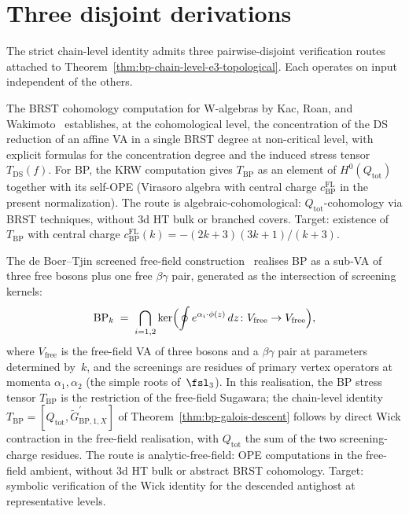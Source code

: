 \section{Three disjoint derivations}
\label{sec:bp-independent-verification-decorators}

The strict chain-level identity admits three pairwise-disjoint
verification routes attached to
Theorem~\ref{thm:bp-chain-level-e3-topological}. Each operates on
input independent of the others.

\begin{remark}
\label{rem:bp-decorator-D1-KRW}
The BRST cohomology computation for W-algebras by Kac, Roan, and
Wakimoto~\cite{KacRoanWakimoto03} establishes, at the cohomological
level, the concentration of the DS reduction of an affine VA in a
single BRST degree at non-critical level, with explicit formulas for
the concentration degree and the induced stress tensor
$T_{\mathrm{DS}}(f)$. For BP, the KRW computation gives
$T_{\mathrm{BP}}$ as an element of $H^{0}(Q_{\mathrm{tot}})$ together
with its self-OPE (Virasoro algebra with central charge
$c^{\mathrm{FL}}_{\mathrm{BP}}$ in the present normalization). The route is algebraic-cohomological:
$Q_{\mathrm{tot}}$-cohomology via BRST techniques, without 3d HT bulk
or branched covers. Target: existence of $T_{\mathrm{BP}}$ with
central charge $c^{\mathrm{FL}}_{\mathrm{BP}}(k) = -(2k+3)(3k+1)/(k+3)$.
\end{remark}

\begin{remark}
\label{rem:bp-decorator-D2-dBT}
The de Boer--Tjin screened free-field
construction~\cite{deBoerTjin93} realises BP as a sub-VA of three
free bosons plus one free $\beta\gamma$ pair, generated as the
intersection of screening kernels:
\[
 \mathrm{BP}_k
 \;=\; \bigcap_{i=1,2}
 \ker\Bigl(\oint e^{\alpha_i \cdot \phi(z)}\, dz \colon
 V_{\mathrm{free}} \to V_{\mathrm{free}}\Bigr),
\]
where $V_{\mathrm{free}}$ is the free-field VA of three bosons and
a $\beta\gamma$ pair at parameters determined by~$k$, and the
screenings are residues of primary vertex operators at momenta
$\alpha_1, \alpha_2$ (the simple roots of~$\fsl_3$). In this
realisation, the BP stress tensor $T_{\mathrm{BP}}$ is the
restriction of the free-field Sugawara; the chain-level identity
$T_{\mathrm{BP}} = [Q_{\mathrm{tot}}, \widetilde G^{\prime}_{\mathrm{BP}, 1, X}]$
of Theorem~\ref{thm:bp-galois-descent} follows by direct Wick
contraction in the free-field realisation, with $Q_{\mathrm{tot}}$ the
sum of the two screening-charge residues. The route is
analytic-free-field: OPE computations in the free-field ambient,
without 3d HT bulk or abstract BRST cohomology. Target: symbolic
verification of the Wick identity for the descended antighost at
representative levels.
\end{remark}


